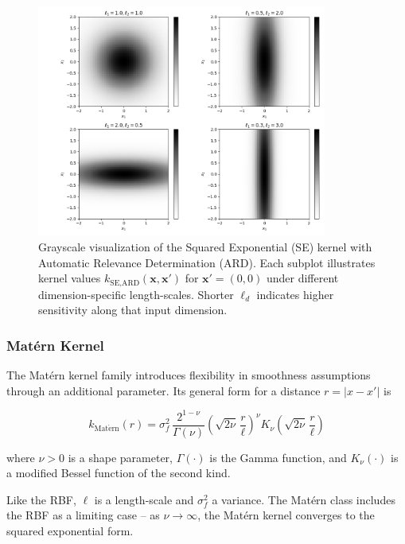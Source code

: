 \documentclass{ut-thesis}
\begin{document}
\begin{figure}[htbp]
    \centering
    \includegraphics[width=0.85\textwidth]{rbf_with_ard.png}
    \caption[Visualization of the Squared Exponential (SE) kernel with Automatic Relevance Determination (ARD). ]
        {Grayscale visualization of the Squared Exponential (SE) kernel with Automatic Relevance Determination (ARD). 
        Each subplot illustrates kernel values \( k_{\text{SE,ARD}}(\mathbf{x}, \mathbf{x'}) \) for $\mathbf{x'} = (0, 0)$ under different dimension-specific length-scales. Shorter \( \ell_d \) indicates higher sensitivity along that input dimension.
    }
    \label{fig:ard_kernel_bw}
\end{figure}

\subsubsection{Matérn Kernel}
The Matérn kernel family introduces flexibility in smoothness assumptions through an additional parameter\cite{rasmussen2006gaussian}. Its general form for a distance $r = |x - x'|$ is

\begin{equation}
    k_{\mathrm{Mat\acute{e}rn}}(r)
= \sigma_f^2 \,\frac{2^{1-\nu}}{\Gamma(\nu)}
\left(\sqrt{2\nu}\,\frac{r}{\ell}\right)^{\nu}
K_{\nu}\!\left(\sqrt{2\nu}\,\frac{r}{\ell}\right)
\end{equation}

where $\nu > 0$ is a shape parameter, $\Gamma(\cdot)$ is the Gamma function, and $K_{\nu}(\cdot)$ is a modified Bessel function of the second kind. 

Like the RBF, $\ell$ is a length-scale and $\sigma_f^2$ a variance. The Matérn class includes the RBF as a limiting case – as $\nu \to \infty$, the Matérn kernel converges to the squared exponential form. 
\end{document}
